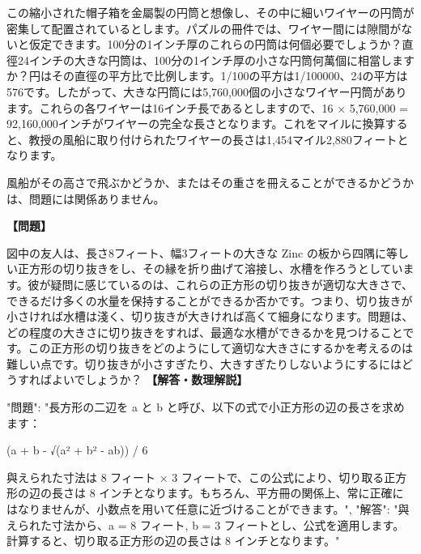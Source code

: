 \documentclass[10pt,a4paper,oneside,openany]{ltjsbook}
\begin{document}
\begin{tcolorbox}[colback=softblue,colframe=primaryblue,title=\textbf{第 200 問：風船型のワイヤーの長さを求めるパズル （原題: A KITE-FLYING PUZZLE.）},arc=2mm,boxrule=1pt,breakable]
この縮小された帽子箱を金屬製の円筒と想像し、その中に細いワイヤーの円筒が密集して配置されているとします。パズルの冊件では、ワイヤー間には隙間がないと仮定できます。100分の1インチ厚のこれらの円筒は何個必要でしょうか？直徑24インチの大きな円筒は、100分の1インチ厚の小さな円筒何萬個に相當しますか？円はその直徑の平方比で比例します。1/100の平方は1/100000、24の平方は576です。したがって、大きな円筒には5,760,000個の小さなワイヤー円筒があります。これらの各ワイヤーは16インチ長であるとしますので、16 × 5,760,000 = 92,160,000インチがワイヤーの完全な長さとなります。これをマイルに換算すると、教授の風船に取り付けられたワイヤーの長さは1,454マイル2,880フィートとなります。

風船がその高さで飛ぶかどうか、またはその重さを冊えることができるかどうかは、問題には関係ありません。
\end{tcolorbox}

\begin{tcolorbox}[colback=softblue,colframe=primaryblue,title=\textbf{第 201 問：HOW TO MAKE CISTERNS.},arc=2mm,boxrule=1pt,breakable]
\textbf{【問題】}\par\vspace{0.3em}
図中の友人は、長さ8フィート、幅3フィートの大きな Zinc の板から四隅に等しい正方形の切り抜きをし、その縁を折り曲げて溶接し、水槽を作ろうとしています。彼が疑問に感じているのは、これらの正方形の切り抜きが適切な大きさで、できるだけ多くの水量を保持することができるか否かです。つまり、切り抜きが小さければ水槽は淺く、切り抜きが大きければ高くて細身になります。問題は、どの程度の大きさに切り抜きをすれば、最適な水槽ができるかを見つけることです。この正方形の切り抜きをどのようにして適切な大きさにするかを考えるのは難しい点です。切り抜きが小さすぎたり、大きすぎたりしないようにするにはどうすればよいでしょうか？
\tcblower
\textbf{【解答・数理解説】}\par\vspace{0.3em}
{
  "問題": "長方形の二辺を a と b と呼び、以下の式で小正方形の辺の長さを求めます：

    (a + b - √(a² + b² - ab)) / 6

與えられた寸法は 8 フィート × 3 フィートで、この公式により、切り取る正方形の辺の長さは 8 インチとなります。もちろん、平方冊の関係上、常に正確にはなりませんが、小数点を用いて任意に近づけることができます。",
  "解答": "與えられた寸法から、a = 8 フィート, b = 3 フィートとし、公式を適用します。計算すると、切り取る正方形の辺の長さは 8 インチとなります。"
}
\end{tcolorbox}
\end{document}
